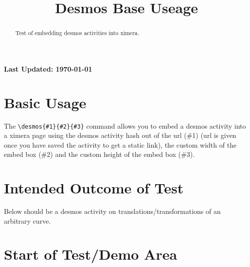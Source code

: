 \documentclass{ximera}
\title{Desmos Base Useage}
\begin{document}
\begin{abstract}
    Test of embedding desmos activities into ximera. 
\end{abstract}
\maketitle

{{\Huge \bfseries Last Updated: \today}} \\


\section{Basic Usage}
The \verb|\desmos{#1}{#2}{#3}| command allows you to embed a desmos activity into a ximera page using the desmos activity hash out of the url (\#1)
(url is given once you have saved the activity to get a static link), 
the custom width of the embed box (\#2) and the custom height of the embed box (\#3).

\section{Intended Outcome of Test}
Below should be a desmos activity on translations/transformations of an arbitrary curve.

\section{Start of Test/Demo Area}

\hrulefill
\end{document}
